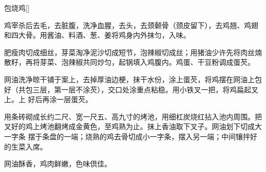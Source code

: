 \begin{recipe}{包烧鸡}[\footnotemark]

\ingredients



\preparation

\step 鸡宰杀后去毛，去脏腹，洗净血腥，去头，去颈颡骨（颈皮留下），去鸡翘、鸡翅
和四大骨。用酱油、料酒、葱、姜将鸡身内外抹匀，入味。

\step 肥瘦肉切成细丝，芽菜淘净泥沙切成短节，泡辣椒切成丝；用猪油少许先将肉丝煵
散籽，再将芽菜、泡辣椒共同炒匀，起锅填入鸡腹内。鸡蛋、干豆粉调成蛋芡。

\step 网油洗净晾干铺于案上，去掉厚油边梗，抹干水份，涂上蛋芡，将鸡摆在网油上包
好（共包三层，第一层不涂芡），交口处涂重点粘稳。用小铁叉一把，将鸡扁起叉上。上
好后再涂一层蛋芡。

\step 用条砖砌成长约二尺、宽一尺五、高九寸的烤池，用细杠炭烧红拈入池内周围。把
叉好的鸡上烤池翻烤成金黄色，至鸡熟为止。抹上香油取下叉子。网油划下切成大一字条
摆于条盘的一端；烧熟的鸡去骨切成小一字条，摆入另一端；中间镶拌好的生菜入席。

\features

网油酥香，鸡肉鲜嫩，色味倶佳。


\end{recipe}

